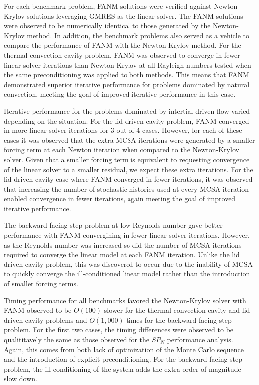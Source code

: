 For each benchmark problem, FANM solutions were verified against
Newton-Krylov solutions leveraging GMRES as the linear solver. The
FANM solutions were observed to be numerically identical to those
generated by the Newton-Krylov method. In addition, the benchmark
problems also served as a vehicle to compare the performance of FANM
with the Newton-Krylov method. For the thermal convection cavity
problem, FANM was observed to converge in fewer linear solver
iterations than Newton-Krylov at all Rayleigh numbers tested when the
same preconditioning was applied to both methods. This means that FANM
demonstrated superior iterative performance for problems dominated by
natural convection, meeting the goal of improved iterative performance
in this case.

Iterative performance for the problems dominated by intertial driven
flow varied depending on the situation. For the lid driven cavity
problem, FANM converged in more linear solver iterations for 3 out of
4 cases. However, for each of these cases it was observed that the
extra MCSA iterations were generated by a smaller forcing term at each
Newton iteration when compared to the Newton-Krylov solver. Given that
a smaller forcing term is equivalent to requesting convergence of the
linear solver to a smaller residual, we expect these extra
iterations. For the lid driven cavity case where FANM converged in
fewer iterations, it was observed that increasing the number of
stochastic histories used at every MCSA iteration enabled convergence
in fewer iterations, again meeting the goal of improved iterative
performance.

The backward facing step problem at low Reynolds number gave better
performance with FANM convergining in fewer linear solver
iterations. However, as the Reynolds number was increased so did the
number of MCSA iterations required to converge the linear model at
each FANM iteration. Unlike the lid driven cavity problem, this was
discovered to occur due to the inability of MCSA to quickly converge
the ill-conditioned linear model rather than the introduction of
smaller forcing terms.

Timing performance for all benchmarks favored the Newton-Krylov solver
with FANM observed to be $O(100)$ slower for the thermal convection
cavity and lid driven cavity problems and $O(1,000)$ times for the
backward facing step problem. For the first two cases, the timing
differences were observed to be qualititavely the same as those
observed for the $SP_N$ performance analysis. Again, this comes from
both lack of optimization of the Monte Carlo sequence and the
introduction of explicit preconditioning. For the backward facing step
problem, the ill-conditioning of the system adds the extra order of
magnitude slow down.

